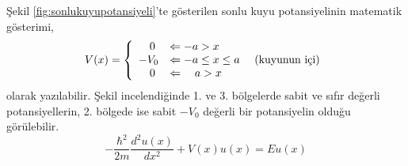 \documentclass[00_kitap.tex]{subfiles}
\begin{document}
Şekil 	\ref{fig:sonlukuyupotansiyeli}'te gösterilen sonlu kuyu potansiyelinin matematik gösterimi,
\begin{align}
V ( x )  = \left\{ 
\begin{array} { l l } 
{ \quad 0 } & {\Leftarrow -a > x } \\
{-V _ { 0 } } & {\Leftarrow -a \leq x \leq a } \quad \text{ (kuyunun içi)} \\
{ \quad 0 } & {\Leftarrow \quad a > x }
\end{array} \right. 
\end{align}
olarak yazılabilir. Şekil incelendiğinde 1. ve 3. bölgelerde sabit ve sıfır değerli potansiyellerin, 2. bölgede ise sabit $-V_0$ değerli bir potansiyelin olduğu görülebilir.
\begin{equation}
- \frac { \hbar ^ { 2 } } { 2 m } \frac { d ^ { 2 } u ( x ) } { d x ^ { 2 } } + V ( x ) u ( x ) = E u ( x )
\end{equation}
\end{document}
